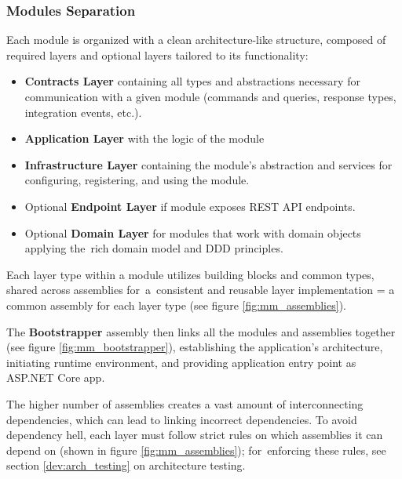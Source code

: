 \subsubsection{Modules Separation}

Each module is organized with a clean architecture-like structure, composed of required layers and optional layers tailored to its functionality:
\begin{itemize}
    \item \textbf{Contracts Layer} containing all types and abstractions necessary for communication with a given module (commands and queries, response types, integration events, etc.).
    
    \item \textbf{Application Layer} with the logic of the module
    
    \item \textbf{Infrastructure Layer} containing the module's abstraction and services for configuring, registering, and using the module.
    
    \item Optional \textbf{Endpoint Layer} if module exposes REST API endpoints.

    \item Optional \textbf{Domain Layer} for modules that work with domain objects applying the~rich domain model and DDD principles.
\end{itemize}

Each layer type within a module utilizes building blocks and common types, shared across assemblies for~a~consistent and reusable layer implementation = a common assembly for each layer type (see figure \ref{fig:mm_assemblies}).

The \textbf{Bootstrapper} assembly then links all the modules and assemblies together (see figure \ref{fig:mm_bootstrapper}), establishing the application's architecture, initiating runtime environment, and providing application entry point as ASP.NET Core app.

The higher number of assemblies creates a vast amount of interconnecting dependencies, which can lead to linking incorrect dependencies. To avoid dependency hell, each layer must follow strict rules on which assemblies it can depend on (shown in figure \ref{fig:mm_assemblies}); for~enforcing these rules, see section \ref{dev:arch_testing} on architecture testing.

